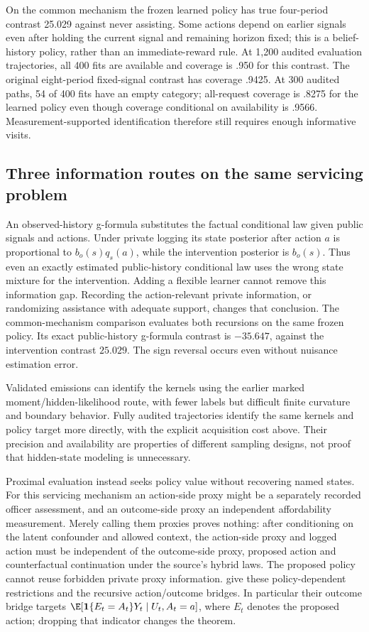 On the common mechanism the frozen learned policy has true four-period
contrast 25.029 against never assisting. Some actions depend on earlier
signals even after holding the current signal and remaining horizon fixed;
this is a belief-history policy, rather than an immediate-reward rule.
At 1,200 audited evaluation trajectories, all 400 fits are available and
coverage is .950 for this contrast. The original eight-period fixed-signal
contrast has coverage .9425. At 300 audited paths, 54 of 400 fits have an
empty category; all-request coverage is .8275 for the learned policy even
though coverage conditional on availability is .9566. Measurement-supported
identification therefore still requires enough informative visits.

\subsection{Three information routes on the same servicing problem}
An observed-history g-formula substitutes the factual conditional law given
public signals and actions. Under private logging its state posterior after
action $a$ is proportional to $b_o(s)q_s(a)$, while the intervention posterior
is $b_o(s)$. Thus even an exactly estimated public-history conditional law
uses the wrong state mixture for the intervention. Adding a flexible learner
cannot remove this information gap. Recording the action-relevant private
information, or randomizing assistance with adequate support, changes that
conclusion. The common-mechanism comparison evaluates both recursions on the
same frozen policy. Its exact public-history g-formula contrast is $-35.647$,
against the intervention contrast $25.029$. The sign reversal occurs even
without nuisance estimation error.

Validated emissions can identify the kernels using the earlier marked
moment/hidden-likelihood route, with fewer labels but difficult finite
curvature and boundary behavior. Fully audited trajectories identify the
same kernels and policy target more directly, with the explicit acquisition
cost above. Their precision and availability are properties of different
sampling designs, not proof that hidden-state modeling is unnecessary.

Proximal evaluation instead seeks policy value without recovering named
states. For this servicing mechanism an action-side proxy might be a
separately recorded officer assessment, and an outcome-side proxy an
independent affordability measurement. Merely calling them proxies proves
nothing: after conditioning on the latent confounder and allowed context,
the action-side proxy and logged action must be independent of the
outcome-side proxy, proposed action and counterfactual continuation under
the source's hybrid laws. The proposed policy cannot reuse forbidden private
proxy information. \citet[Assumptions 1--2, Theorem 2 and Table 1]{bennettprox2023}
give these policy-dependent restrictions and the recursive action/outcome
bridges. In particular their outcome bridge targets
$\E[\mathbf1\{E_t=A_t\}Y_t\mid U_t,A_t=a]$, where $E_t$ denotes the
proposed action; dropping that indicator changes the theorem.


